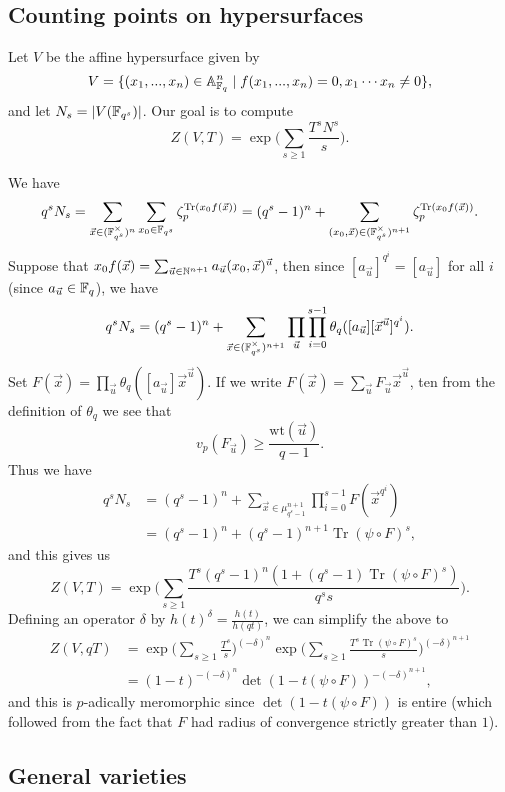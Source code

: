 \documentclass[letterpaper,11pt]{article}
\DeclareMathOperator{\Tr}{Tr}
\begin{document}
\subsection{Counting points on hypersurfaces}

Let $V$ be the affine hypersurface given by
\[
V = \{(x_1, ..., x_n) \in \mathbb{A}^n_{\mathbb{F}_q} \mid f(x_1, ..., x_n) = 0, x_1\cdots x_n \ne 0\},
\]
and let $N_s = |V(\mathbb{F}_{q^s})|$. Our goal is to compute
\[
Z(V,T) = \exp\Big(\sum_{s \ge 1} \frac{T^sN^s}{s}\Big).
\]

We have
\[
q^sN_s = \sum_{\vec{x}\in (\FF_{q^s}^{\times})^n} \sum_{x_0 \in \FF_{q^s}} \zeta_p^{\Tr(x_0f(\vec{x}))} = (q^s-1)^n + \sum_{(x_0,\vec{x})\in (\FF_{q^s}^{\times})^{n+1}} \zeta_p^{\Tr(x_0f(\vec{x}))}.
\]
Suppose that $x_0f(\vec{x}) = \sum_{\vec{u} \in \mathbb{N}^{n+1}} a_{\vec{u}} (x_0,\vec{x})^{\vec{u}}$, then since $[a_{\vec{u}}]^{q^i} = [a_{\vec{u}}]$ for all $i$ (since $a_{\vec{u}} \in \mathbb{F}_q$), we have
\[
q^sN_s = (q^s-1)^n + \sum_{\vec{x}\in (\mathbb{F}_{q^s}^{\times})^{n+1}} \prod_{\vec{u}} \prod_{i=0}^{s-1} \theta_q([a_{\vec{u}}][\vec{x}^{\vec{u}}]^{q^i}).
\]
Set $F(\vec{x}) = \prod_{\vec{u}}\theta_q([a_{\vec{u}}]\vec{x}^{\vec{u}})$. If we write $F(\vec{x}) = \sum_{\vec{u}} F_{\vec{u}}\vec{x}^{\vec{u}}$, ten from the definition of $\theta_q$ we see that
\[
v_p(F_{\vec{u}}) \ge \frac{\mbox{wt}(\vec{u})}{q-1}.
\]
Thus we have
\begin{align*}
q^sN_s &= (q^s-1)^n + \sum_{\vec{x}\in \mu_{q^s-1}^{n+1}} \prod_{i=0}^{s-1} F(\vec{x}^{q^i})\\
&= (q^s-1)^n + (q^s-1)^{n+1}\Tr(\psi \circ F)^s,
\end{align*}
and this gives us
\[
Z(V,T) = \exp\Bigg(\sum_{s \ge 1} \frac{T^s(q^s-1)^n(1+(q^s-1)\Tr(\psi\circ F)^s)}{q^ss}\Bigg).
\]
Defining an operator $\delta$ by $h(t)^{\delta} = \frac{h(t)}{h(qt)}$, we can simplify the above to
\begin{align*}
Z(V,qT) &= \exp\Bigg(\sum_{s \ge 1} \frac{T^s}{s}\Bigg)^{(-\delta)^n}\exp\Bigg(\sum_{s \ge 1} \frac{T^s\Tr (\psi\circ F)^s}{s}\Bigg)^{(-\delta)^{n+1}}\\
&= (1-t)^{-(-\delta)^n}\det(1-t(\psi\circ F))^{-(-\delta)^{n+1}},
\end{align*}
and this is $p$-adically meromorphic since $\det(1-t(\psi\circ F))$ is entire (which followed from the fact that $F$ had radius of convergence strictly greater than $1$).

\subsection{General varieties}
\end{document}

